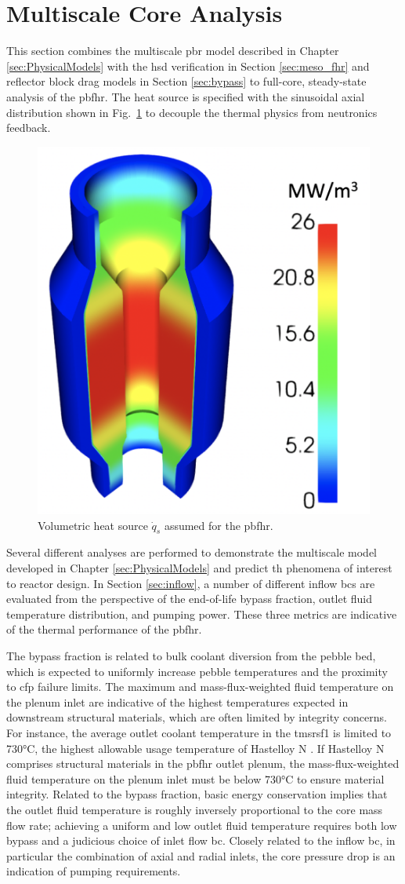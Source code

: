 \section{Multiscale Core Analysis}
\label{sec:core}

This section combines the multiscale \gls{pbr} model described in Chapter \ref{sec:PhysicalModels} with the \gls{hsd} verification in Section \ref{sec:meso_fhr} and reflector block drag models in Section \ref{sec:bypass} to full-core, steady-state analysis of the \gls{pbfhr}. The heat source is specified with the sinusoidal axial distribution shown in Fig.\ \ref{fig:heat_source} to decouple the thermal physics from neutronics feedback.

\begin{figure}[h!]
\centering
\includegraphics[width=0.375\linewidth]{figs/heat_source.png}
\caption{Volumetric heat source \(\dot{q}_s\) assumed for the \gls{pbfhr}.}
\label{fig:heat_source}
\end{figure}

Several different analyses are performed to demonstrate the multiscale model developed in Chapter \ref{sec:PhysicalModels} and predict \gls{th} phenomena of interest to reactor design. In Section \ref{sec:inflow}, a number of different inflow \glspl{bc} are evaluated from the perspective of the end-of-life bypass fraction, outlet fluid temperature distribution, and pumping power. These three metrics are indicative of the thermal performance of the \gls{pbfhr}. 

The bypass fraction is related to bulk coolant diversion from the pebble bed, which is expected to uniformly increase pebble temperatures and the proximity to \gls{cfp} failure limits. The maximum and mass-flux-weighted fluid temperature on the plenum inlet are indicative of the highest temperatures expected in downstream structural materials, which are often limited by integrity concerns. For instance, the average outlet coolant temperature in the \gls{tmsrsf1} is limited to 730\si{\celsius}, the highest allowable usage temperature of Hastelloy N \cite{xiao}. If Hastelloy N comprises structural materials in the \gls{pbfhr} outlet plenum, the mass-flux-weighted fluid temperature on the plenum inlet must be below 730\si{\celsius} to ensure material integrity. Related to the bypass fraction, basic energy conservation implies that the outlet fluid temperature is roughly inversely proportional to the core mass flow rate; achieving a uniform and low outlet fluid temperature requires both low bypass and a judicious choice of inlet flow \gls{bc}. Closely related to the inflow \gls{bc}, in particular the combination of axial and radial inlets, the core pressure drop is an indication of pumping requirements. 


